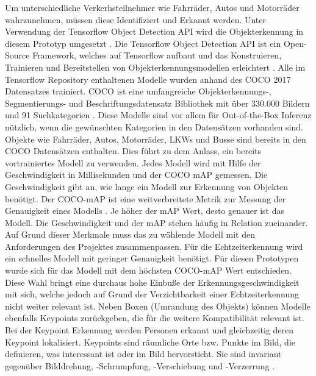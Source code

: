 Um unterschiedliche Verkerhsteilnehmer wie Fahrräder, Autos und Motorräder wahrzunehmen, müssen diese Identifiziert und Erkannt werden. Unter Verwendung der Tensorflow Object Detection \ac{API} wird die Objekterkennung in diesem Prototyp umgesetzt \cite{tf_object_detection_github}. Die Tensorflow Object Detection API ist ein Open-Source Framework, welches auf Tensorflow aufbaut und das Konstruieren, Trainieren und Bereitstellen von Objekterkennungsmodellen erleichtert \cite{tf_object_detection_github}. Alle im Tensorflow Repository enthaltenen Modelle wurden anhand des \ac{COCO} 2017 Datensatzes trainiert. \ac{COCO} ist eine umfangreiche Objekterkennungs-, Segmentierungs- und Beschriftungsdatensatz Bibliothek mit über 330.000 Bildern und 91 Suchkategorien \cite{DBLP:journals/corr/LinMBHPRDZ14}. Diese Modelle sind vor allem für Out-of-the-Box Inferenz nützlich, wenn die gewünschten Kategorien in den Datensätzen vorhanden sind. Objekte wie Fahrräder, Autos, Motorräder, LKWs und Busse sind bereits in den \ac{COCO} Datensätzen enthalten. Dies führt zu dem Anlass, ein bereits vortrainiertes Modell zu verwenden. Jedes Modell wird mit Hilfe der Geschwindigkeit in Millisekunden und der \ac{COCO} \ac{mAP} gemessen. Die Geschwindigkeit gibt an, wie lange ein Modell zur Erkennung von Objekten benötigt. Der \ac{COCO}-\ac{mAP} ist eine weitverbreitete Metrik zur Messung der Genauigkeit eines Modells \cite{jonathanhui}. Je höher der \ac{mAP} Wert, desto genauer ist das Modell. Die Geschwindigkeit und der \ac{mAP} stehen häufig in Relation zueinander. 
Auf Grund dieser Merkmale muss das zu wählende Modell mit den Anforderungen des Projektes zusammenpassen. Für die Echtzeiterkennung wird ein schnelles Modell mit geringer Genauigkeit benötigt. Für diesen Prototypen wurde sich für das Modell mit dem höchsten \ac{COCO}-\ac{mAP} Wert entschieden. Diese Wahl bringt eine durchaus hohe Einbuße der Erkennungsgeschwindigkeit mit sich, welche jedoch auf Grund der Verzichtbarkeit einer Echtzeiterkennung nicht weiter relevant ist. Neben Boxen (Umrandung des Objekts) können Modelle ebenfalls Keypoints zurückgeben, die für die weitere Kompatibilität relevant ist. Bei der Keypoint Erkennung werden Personen erkannt und gleichzeitig deren Keypoint lokalisiert. Keypoints sind räumliche Orte bzw. Punkte im Bild, die definieren, was interessant ist oder im Bild hervorsticht. Sie sind invariant gegenüber Bilddrehung, -Schrumpfung, -Verschiebung und -Verzerrung \cite{kp_detection}.

